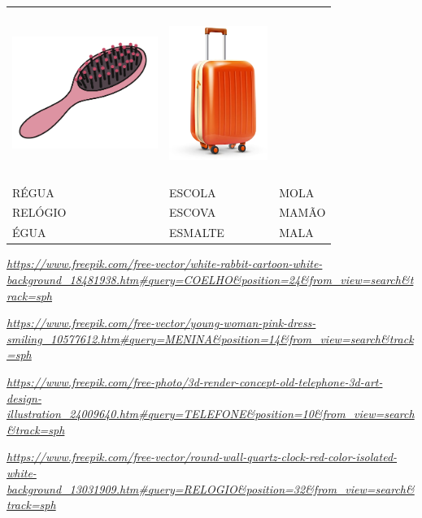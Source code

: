 \begin{longtable}[]{@{}lll@{}}
\includegraphics[width=1.86458in,height=1.77083in]{media/image75.png} &
\includegraphics[width=1.26319in,height=2.15625in]{media/image76.png}\tabularnewline
RÉGUA & ESCOLA & MOLA\tabularnewline
RELÓGIO & ESCOVA & MAMÃO\tabularnewline
ÉGUA & ESMALTE & MALA\tabularnewline
\bottomrule
\end{longtable}

\href{https://www.freepik.com/free-vector/white-rabbit-cartoon-white-background_18481938.htm\#query=COELHO\&position=24\&from_view=search\&track=sph}{\emph{https://www.freepik.com/free-vector/white-rabbit-cartoon-white-background\_18481938.htm\#query=COELHO\&position=24\&from\_view=search\&track=sph}}

\href{https://www.freepik.com/free-vector/young-woman-pink-dress-smiling_10577612.htm\#query=MENINA\&position=14\&from_view=search\&track=sph}{\emph{https://www.freepik.com/free-vector/young-woman-pink-dress-smiling\_10577612.htm\#query=MENINA\&position=14\&from\_view=search\&track=sph}}

\href{https://www.freepik.com/free-photo/3d-render-concept-old-telephone-3d-art-design-illustration_24009640.htm\#query=TELEFONE\&position=10\&from_view=search\&track=sph}{\emph{https://www.freepik.com/free-photo/3d-render-concept-old-telephone-3d-art-design-illustration\_24009640.htm\#query=TELEFONE\&position=10\&from\_view=search\&track=sph}}

\href{https://www.freepik.com/free-vector/round-wall-quartz-clock-red-color-isolated-white-background_13031909.htm\#query=RELOGIO\&position=32\&from_view=search\&track=sph}{\emph{https://www.freepik.com/free-vector/round-wall-quartz-clock-red-color-isolated-white-background\_13031909.htm\#query=RELOGIO\&position=32\&from\_view=search\&track=sph}}


